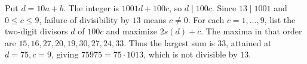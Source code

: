 Put $d=10a+b$. The integer is $1001d+100c$, so $d\mid100c$. Since $13\mid1001$ and $0\le c\le9$, failure of divisibility by $13$ means $c\ne0$. For each $c=1,\ldots,9$, list the two-digit divisors $d$ of $100c$ and maximize $2s(d)+c$. The maxima in that order are $15,16,27,20,19,30,27,24,33$. Thus the largest sum is $\boxed{33}$, attained at $d=75,c=9$, giving $75975=75\cdot1013$, which is not divisible by $13$.
